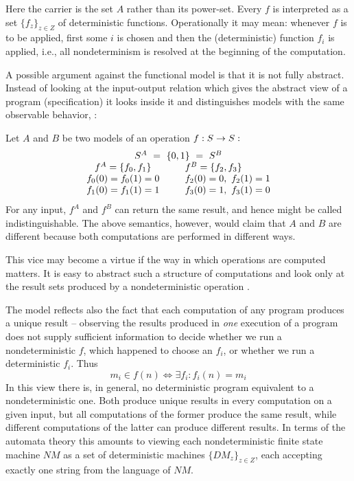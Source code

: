  Here the carrier is the set $A$ 
rather than its power-set. Every $f$ is interpreted as a set 
$\{f_{z}\}_{z\in Z}$ of deterministic functions. Operationally it may 
mean: whenever $f$
 is to be applied, first some $i$ is chosen and then the 
(deterministic) function $f_{i}$ is applied, i.e., all 
nondeterminism is resolved at the beginning of the computation.  

A possible argument against the functional model is that it is not 
fully abstract. Instead of looking at the input-output relation which 
gives the abstract view of a program (specification) it looks inside 
it and distinguishes models with the same observable behavior, \cite{c:58, c:59}: 

\begin{Example}\label{ex:func} 
Let $A$ and $B$ be two models of an operation $f:S\mathrel{\rightarrow} S:$
\[ \begin{array}{c@{\ \ \ \ \ \ \ \ }l}
\multicolumn{2}{c}{ S^{A}\ =\ \{0,1\}\ =\ S^{B}} \\
 f^{A}=\{f_{0}, f_{1}\} &  f^{B}=\{f_{2}, f_{3}\} \\
 f_{0}(0)=f_{0}(1) = 0 & f_{2}(0)=0,\  f_{2}(1) = 1 \\
  f_{1}(0)=f_{1}(1) = 1 & f_{3}(0)=1,\  f_{3}(1) = 0
  \end{array}
\]
 For any input, $f^{A}$ and $f^{B}$ can return the same 
result, and hence might be called indistinguishable. The above 
semantics, however, would claim that $A$ and $B$
 are different because both computations are performed in different 
ways.
\end{Example}

This vice may become a virtue if the way in which 
operations are computed matters. It is easy to abstract such a 
structure of computations and look only at the result sets produced 
by a nondeterministic operation \cite{c:126}. 

The model reflects also the fact 
that each computation of any program produces a unique result  --  
observing the results produced in {\em one}
 execution of a program does not supply sufficient information to 
decide whether we run a nondeterministic $f$, which happened to 
choose an $f_{i}$, or whether we run a deterministic 
$f_{i}$. Thus  
\[ 
m_{i}\in f(n) \iff \exists f_{i}: f_{i}(n) = m_{i}
\]   
 In this view there is, in general, 
no deterministic program equivalent to a nondeterministic one. Both 
produce unique results in every computation on a given input, but 
all computations of the former produce the 
same result, while different computations of the latter can produce 
different results. In terms of the automata theory this amounts to 
viewing each nondeterministic finite state machine 
$N\!M$ as a set of deterministic machines $\{D\!M_{z}\}_{z\in Z}$, each accepting 
exactly one string from the language of $N\!M$.

